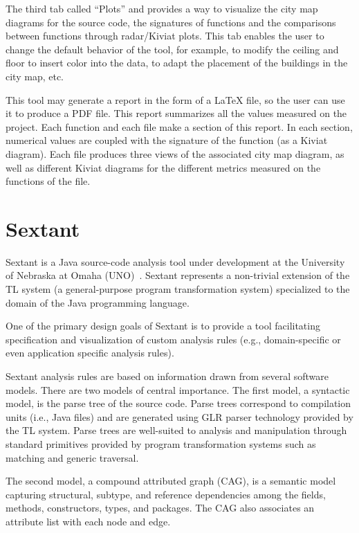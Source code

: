 The third tab called “Plots” and provides a way to visualize the city map diagrams for the source code, the signatures of functions and the comparisons between functions through radar/Kiviat plots. This tab enables the user to change the default behavior of the tool, for example, to modify the ceiling and floor to insert color into the data, to adapt the placement of the buildings in the city map, etc. 

This tool may generate a report in the form of a LaTeX file, so the user can use it to produce a PDF file. This report summarizes all the values measured on the project. Each function and each file make a section of this report. In each section, numerical values are coupled with the signature of the function (as a Kiviat diagram). Each file produces three views of the associated city map diagram, as well as different Kiviat diagrams for the different metrics measured on the functions of the file. 

\section{Sextant}

Sextant is a Java source-code analysis tool under development at the University of Nebraska at Omaha (UNO)~\cite{sextant}. Sextant represents a non-trivial extension of the TL system (a general-purpose program
transformation system) specialized to the domain of the Java
programming language.

One of the primary design goals of Sextant is to provide a tool facilitating specification and visualization of custom analysis rules (e.g., domain-specific or even application specific analysis rules).

Sextant analysis rules are based on information drawn from several software models. There are two models of central importance. The first model, a syntactic model, is the parse tree of the source code. Parse trees correspond
to compilation units (i.e., Java files) and are generated using GLR parser technology provided by the TL system. Parse trees are well-suited to analysis and manipulation through standard primitives provided by program transformation systems such as matching and generic traversal.

The second model, a compound attributed graph (CAG), is a semantic model capturing structural, subtype, and reference dependencies among the fields, methods, constructors, types, and packages. The CAG also associates an attribute list with each node and edge.

